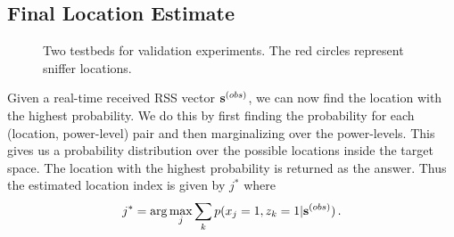 \subsection{Final Location Estimate}
\label{subsec:finallocationestimate}

\begin{figure}
	\centering
		 \quad \quad
	\caption{Two testbeds for validation experiments. The red circles represent sniffer locations.}
	\label{fig:experimenttestbed}
\end{figure}


Given a real-time received RSS vector ${\bf {s}}^{(obs)}$, we can now
find the location with the highest probability. We do this by first
finding the probability for each (location, power-level) pair and then
marginalizing over the power-levels. This gives us a probability
distribution over the possible locations inside the target space. The
location with the highest probability is returned as the answer.
Thus the estimated location index is given by $j^{*}$ where
\begin{align}
j^{*} = \arg\max_{j} \sum_{k} p({x_{j}} = 1, {z_{k}} = 1 | {\bf {s}}^{(obs)}) \, .
\end{align}
